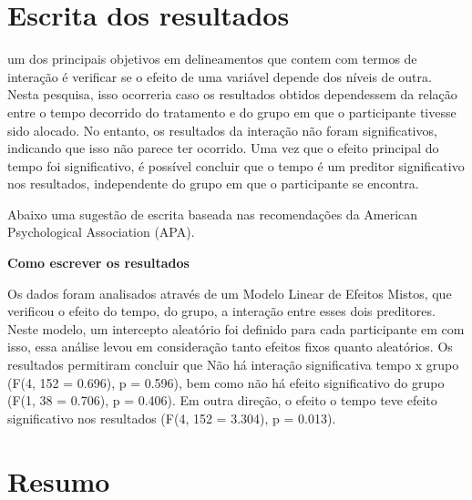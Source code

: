 \documentclass[
]{book}
\begin{document}
\hypertarget{escrita-dos-resultados-10}{%
\section{Escrita dos resultados}\label{escrita-dos-resultados-10}}

um dos principais objetivos em delineamentos que contem com termos de interação é verificar se o efeito de uma variável depende dos níveis de outra. Nesta pesquisa, isso ocorreria caso os resultados obtidos dependessem da relação entre o tempo decorrido do tratamento e do grupo em que o participante tivesse sido alocado. No entanto, os resultados da interação não foram significativos, indicando que isso não parece ter ocorrido. Uma vez que o efeito principal do tempo foi significativo, é possível concluir que o tempo é um preditor significativo nos resultados, independente do grupo em que o participante se encontra.

Abaixo uma sugestão de escrita baseada nas recomendações da American Psychological Association (APA).

\begin{writing}
\textbf{Como escrever os resultados}

Os dados foram analisados através de um Modelo Linear de Efeitos Mistos,
que verificou o efeito do tempo, do grupo, a interação entre esses dois
preditores. Neste modelo, um intercepto aleatório foi definido para cada
participante em com isso, essa análise levou em consideração tanto
efeitos fixos quanto aleatórios. Os resultados permitiram concluir que
Não há interação significativa tempo x grupo (F(4, 152 = 0.696), p =
0.596), bem como não há efeito significativo do grupo (F(1, 38 = 0.706),
p = 0.406). Em outra direção, o efeito o tempo teve efeito significativo
nos resultados (F(4, 152 = 3.304), p = 0.013).
\end{writing}

\hypertarget{resumo-10}{%
\section{Resumo}\label{resumo-10}}
\end{document}
